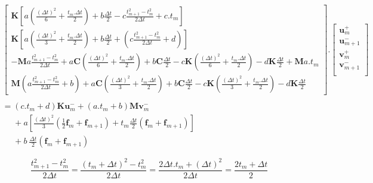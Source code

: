 \documentclass[12pt,a4paper]{report}
\begin{document}
\begin{equation}
\!\!\!\!\!\!\!\!\!\!\!\!\!\!\!\!\!\!\!\!\!\!\!\!\!\!\!\!\!\!\!\!\!\!\!
\begin{array}{l }
	\begin{bmatrix}	   
		   \mathbf{K} \left[
			   a \left( \frac{(\Delta t)^2}{6} + \frac{t_m.\Delta t}{2}
			   		\right)
			   +b \frac{\Delta t}{2} 
			   - c\frac{t_{m+1}^2 - t_m^2}{2\Delta t} 
			   + c.t_m 
			\right]
		\\   
		   \mathbf{K} \left[
			   a \left( \frac{(\Delta t)^2}{3} + \frac{t_m.\Delta t}{2}
			   		\right)
			   +b \frac{\Delta t}{2} 
			   +\left( c\frac{t_{m+1}^2 - t_m^2}{2\Delta t} + d \right)
			\right]
		\\   
		   -\mathbf{M} a\frac{t_{m+1}^2 - t_m^2}{2\Delta t} 
		   +a\mathbf{C}
		   		(\frac{(\Delta t)^2}{6} + \frac{t_m.\Delta t}{2})
		   +b\mathbf{C} \frac{\Delta t}{2}
		   -c\mathbf{K}
		   		(\frac{(\Delta t)^2}{6} + \frac{t_m.\Delta t}{2})
		   -d\mathbf{K} \frac{\Delta t}{2}
		   +\mathbf{M} a.t_m 
		\\   
		   \mathbf{M}
		   		\left( a\frac{t_{m+1}^2 - t_m^2}{2\Delta t} + b \right)
		   +a\mathbf{C}
		   		(\frac{(\Delta t)^2}{3} + \frac{t_m.\Delta t}{2})
		   +b\mathbf{C} \frac{\Delta t}{2}
		   -c\mathbf{K}
		   		(\frac{(\Delta t)^2}{3} + \frac{t_m.\Delta t}{2})
		   -d\mathbf{K} \frac{\Delta t}{2}
	\end{bmatrix}
	.
	\begin{bmatrix}
		   \mathbf{u}_m^+  		\\
		   \mathbf{u}_{m+1}^-  	\\
		   \mathbf{v}_m^+  		\\
		   \mathbf{v}_{m+1}^-  	\\
	\end{bmatrix}
	\\
	\\
		= 
	     (c.t_m+d) \mathbf{K} \mathbf{u}_m^-
	   + (a.t_m+b) \mathbf{M} \mathbf{v}_m^-
	\\ \phantom{=} +\displaystyle
		a \left[
			\frac{(\Delta t)^2}{3}
				\left( \frac{1}{2} \mathbf{f}_m + \mathbf{f}_{m+1} \right)
			+t_m \frac{\Delta t}{2} (\mathbf{f}_m + \mathbf{f}_{m+1}) 
		\right]
	\\ \phantom{=} +\displaystyle
		 b~ \frac{\Delta t}{2}  (\mathbf{f}_m + \mathbf{f}_{m+1})
	
\end{array}
\end{equation}

\begin{equation}
\frac{t_{m+1}^2 - t_m^2}{2 \Delta t}
=\frac{(t_m + \Delta t)^2 - t_m^2}{2 \Delta t}
=\frac{2\Delta t.t_m + (\Delta t)^2}{2 \Delta t}
=\frac{2t_m + \Delta t}{2}
\end{equation}
\end{document}
